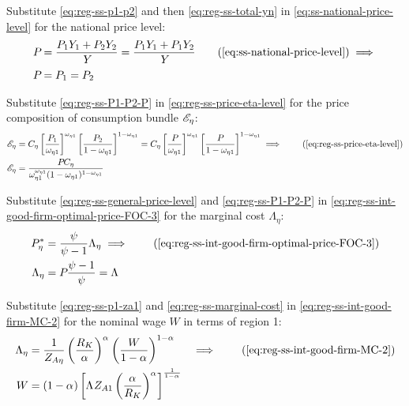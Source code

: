 \documentclass[../thesis.tex]{subfiles}
\begin{document}
Substitute \ref{eq:reg-ss-p1-p2} and then \ref{eq:reg-ss-total-yn} in \ref{eq:ss-national-price-level} for the national price level:
	\begin{align}
		P_{} &= \frac{P_{1} Y_{1} + P_{2} Y_{2}}{Y_{}} = \frac{P_{1} Y_{1} + P_{1} Y_{2}}{Y_{}} \tag{\ref{eq:ss-national-price-level}} \implies \nonumber \\
		P_{} &= P_{1} = P_{2} \label{eq:reg-ss-P1-P2-P}
	\end{align}

Substitute \ref{eq:reg-ss-P1-P2-P} in \ref{eq:reg-ss-price-eta-level} for the price composition of consumption bundle $\te[]$:
\begin{align}
	\te[] &= C_{\eta} \left[ \frac{P_{1}}{\omega_{\eta 1}} \right]^{\omega_{\eta 1}} \left[ \frac{P_{2}}{1 -\omega_{\eta 1}} \right]^{1 -\omega_{\eta 1}} = C_{\eta} \left[ \frac{P_{}}{\omega_{\eta 1}} \right]^{\omega_{\eta 1}} \left[ \frac{P_{}}{1 -\omega_{\eta 1}} \right]^{1 -\omega_{\eta 1}} \implies \tag{\ref{eq:reg-ss-price-eta-level}} \\
	\te[] &= \frac{P_{} C_{\eta}}{\omega_{\eta 1}^{\omega_{\eta 1}} (1 -\omega_{\eta 1})^{1 -\omega_{\eta 1}}} \label{eq:reg-ss-te}
\end{align}

Substitute \ref{eq:reg-ss-general-price-level} and \ref{eq:reg-ss-P1-P2-P} in \ref{eq:reg-ss-int-good-firm-optimal-price-FOC-3} for the marginal cost $\Lambda_{\eta}$:
\begin{align}
	P_{\eta}^{\ast} &= \frac{\psi}{\psi-1} \Lambda_{\eta} \implies \tag{\ref{eq:reg-ss-int-good-firm-optimal-price-FOC-3}} \\
	\Lambda_{\eta} &= P_{} \frac{\psi-1}{\psi} = \Lambda_{} \label{eq:reg-ss-marginal-cost}
\end{align}

Substitute \ref{eq:reg-ss-p1-za1} and \ref{eq:reg-ss-marginal-cost} in \ref{eq:reg-ss-int-good-firm-MC-2} for the nominal wage $W$ in terms of region 1:
\begin{alignat}{2}
	\Lambda_{\eta} &= \frac{1}{Z_{A\eta}} \left( \frac{R_K}{{\alpha_{}}} \right)^{{\alpha_{}}} \left( \frac{W}{1-{\alpha_{}}} \right)^{1-{\alpha_{}}} &\implies \tag{\ref{eq:reg-ss-int-good-firm-MC-2}} \\ 
	W &= (1-{\alpha_{}}) \left[ \Lambda_{} Z_{A1} \left( \frac{{\alpha_{}}}{R_K} \right)^{{\alpha_{}}} \right]^\frac{1}{1-{\alpha_{}}} & \label{eq:reg-ss-nominal-wage}
\end{alignat}

\begin{comment}
	Substitute \ref{eq:reg-ss-nominal-wage} in \ref{eq:reg-ss-int-good-firm-MC-2} for the technology level of region 2, $Z_{A2}$:
	\begin{align}
		\Lambda_{\eta} &= \frac{1}{Z_{A\eta}} \left( \frac{R_K}{{\alpha_{}}} \right)^{{\alpha_{}}} \left( \frac{W}{1-{\alpha_{}}} \right)^{1-{\alpha_{}}} \implies \tag{\ref{eq:reg-ss-int-good-firm-MC-2}} \\
		Z_{A2} &= \frac{1}{\Lambda_{}} \left( \frac{R_K}{{\alpha_{}}} \right)^{{\alpha_{}}} \left( \frac{W}{1-{\alpha_{}}} \right)^{1-{\alpha_{}}} \label{eq:reg-ss-za2}
	\end{align}
\end{comment}
\end{document}
